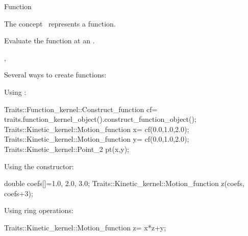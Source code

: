 
\begin{ccRefConcept}{Function}


\ccDefinition
  
The concept \ccClassName\ represents a function. 



\ccTypes




\ccOperations

 {Evaluate the function at an .}

\ccSeeAlso

,

\ccExample

Several ways to create functions:

Using :
\begin{ccExampleCode}
Traits::Function_kernel::Construct_function cf= traits.function_kernel_object().construct_function_object();
Traits::Kinetic_kernel::Motion_function x= cf(0.0,1.0,2.0);
Traits::Kinetic_kernel::Motion_function y= cf(0.0,1.0,2.0);
Traits::Kinetic_kernel::Point_2 pt(x,y);
\end{ccExampleCode}

Using the constructor:
\begin{ccExampleCode}
double coefs[]={1.0, 2.0, 3.0};
Traits::Kinetic_kernel::Motion_function z(coefs, coefs+3);
\end{ccExampleCode}

Using ring operations:
\begin{ccExampleCode}
Traits::Kinetic_kernel::Motion_function z= x*z+y;
\end{ccExampleCode}

\end{ccRefConcept}




